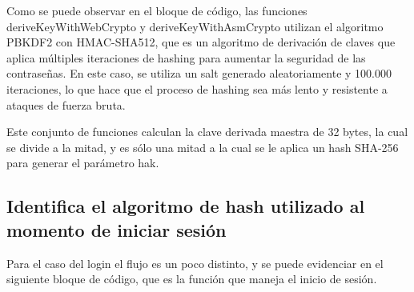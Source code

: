 \documentclass[letter,12pt]{article}
\begin{document}
Como se puede observar en el bloque de código, las funciones deriveKeyWithWebCrypto y deriveKeyWithAsmCrypto utilizan el algoritmo PBKDF2 con HMAC-SHA512, que es un algoritmo de derivación de claves que aplica múltiples iteraciones de hashing para aumentar la seguridad de las contraseñas. En este caso, se utiliza un salt generado aleatoriamente y 100.000 iteraciones, lo que hace que el proceso de hashing sea más lento y resistente a ataques de fuerza bruta.

Este conjunto de funciones calculan la clave derivada maestra de 32 bytes, la cual se divide a la mitad, y es sólo una mitad a la cual se le aplica un hash SHA-256 para generar el parámetro hak.

\subsection{Identifica el algoritmo de hash utilizado al momento de iniciar sesión}

Para el caso del login el flujo es un poco distinto, y se puede evidenciar en el siguiente bloque de código, que es la función que maneja el inicio de sesión.
\end{document}
